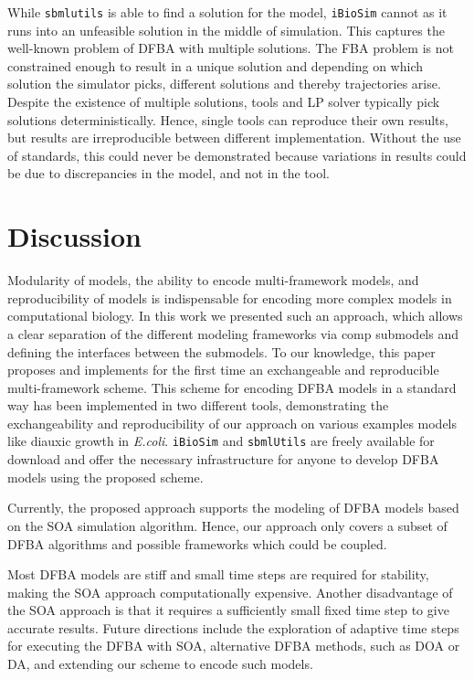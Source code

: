 \documentclass{bioinfo}
\begin{document}
While \texttt{sbmlutils} is able to find a solution for the model, \texttt{iBioSim} cannot as it runs into an unfeasible solution in the middle of simulation. This captures the well-known problem of DFBA with multiple solutions. The FBA problem is not constrained enough to result in a unique solution and  depending on which solution the simulator picks, different solutions and thereby trajectories arise. Despite the existence of multiple solutions, tools and LP solver typically pick solutions deterministically. Hence, single tools can reproduce their own results, but results are irreproducible between different implementation. Without the use of standards, this could never be demonstrated because variations in results could be due to discrepancies in the model, and not in the tool.

\section{Discussion}

Modularity of models, the ability to encode multi-framework models, and reproducibility of models is indispensable for encoding more complex models in computational biology. In this work we presented such an approach, which allows a clear separation of the different modeling frameworks via comp submodels and defining the interfaces between the submodels.
To our knowledge, this paper proposes and implements for the first time an exchangeable and reproducible multi-framework scheme. This scheme for encoding DFBA models in a standard way has been implemented in two different tools, demonstrating the exchangeability and reproducibility of our approach on various examples models like diauxic growth in \emph{E.coli}. \texttt{iBioSim} and \texttt{sbmlUtils} are freely available for download and offer the necessary infrastructure for anyone to develop DFBA models using the proposed scheme.

Currently, the proposed approach supports the modeling of DFBA models based on the SOA simulation algorithm. Hence, our approach only covers a subset of DFBA algorithms and possible frameworks which could be coupled.

Most DFBA models are stiff and small time steps are required for stability, making the SOA approach computationally expensive. Another disadvantage of the SOA approach is that it requires a sufficiently small fixed time step to give accurate results. Future directions include the exploration of adaptive time steps for executing the DFBA with SOA, alternative DFBA methods, such as DOA or DA, and extending our scheme to encode such models.
\end{document}
